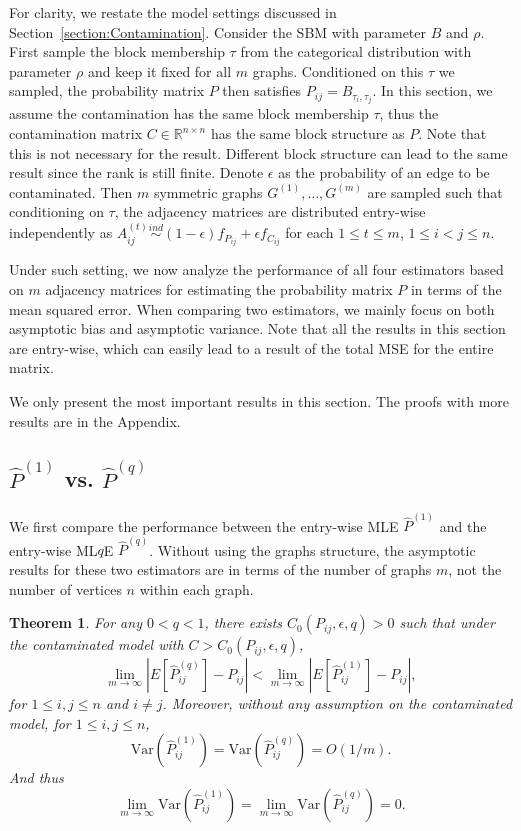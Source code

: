 \documentclass[a4paper]{article}
\newtheorem{theorem}[fact]{Theorem}
\renewcommand{\hat}{\widehat}
\begin{document}
For clarity, we restate the model settings discussed in Section~\ref{section:Contamination}. Consider the SBM with parameter $B$ and $\rho$. First sample the block membership $\tau$ from the categorical distribution with parameter $\rho$ and keep it fixed for all $m$ graphs. Conditioned on this $\tau$ we sampled, the probability matrix $P$ then satisfies $P_{ij} = B_{\tau_i, \tau_j}$. In this section, we assume the contamination has the same block membership $\tau$, thus the contamination matrix $C \in \mathbb{R}^{n \times n}$ has the same block structure as $P$. Note that this is not necessary for the result. Different block structure can lead to the same result since the rank is still finite. Denote $\epsilon$ as the probability of an edge to be contaminated. Then $m$ symmetric graphs $G^{(1)}, \dotsc, G^{(m)}$  are sampled such that conditioning on $\tau$, the adjacency matrices are distributed entry-wise independently as $A^{(t)}_{ij} \stackrel{ind}{\sim} (1-\epsilon) f_{P_{ij}} + \epsilon f_{C_{ij}}$ for each $1 \le t \le m$, $1 \le i < j \le n$. 

Under such setting, we now analyze the performance of all four estimators based on $m$ adjacency matrices for estimating the probability matrix $P$ in terms of the mean squared error. When comparing two estimators, we mainly focus on both asymptotic bias and asymptotic variance. Note that all the results in this section are entry-wise, which can easily lead to a result of the total MSE for the entire matrix.

We only present the most important results in this section. The proofs with more results are in the Appendix.

\subsection{$\hat{P}^{(1)}$ vs. $\hat{P}^{(q)}$}
\label{section:MLEvsMLqE}
We first compare the performance between the entry-wise MLE $\hat{P}^{(1)}$ and the entry-wise ML$q$E $\hat{P}^{(q)}$. Without using the graphs structure, the asymptotic results for these two estimators are in terms of the number of graphs $m$, not the number of vertices $n$ within each graph.



\begin{theorem}
\label{thm:MLEvsMLqE}
For any $0 < q < 1$, there exists $C_0(P_{ij}, \epsilon, q) > 0$ such that under the contaminated model with $C > C_0(P_{ij}, \epsilon, q)$,
\[
	\lim_{m \to \infty} \left| E[\hat{P}^{(q)}_{ij}] - P_{ij} \right| < 
    \lim_{m \to \infty} \left| E[\hat{P}^{(1)}_{ij}] - P_{ij} \right|,
\]
for $1 \le i, j \le n$ and $i \ne j$.
Moreover, without any assumption on the contaminated model, for $1 \le i, j \le n$, 
\[
	\mathrm{Var}(\hat{P}^{(1)}_{ij})
    = \mathrm{Var}(\hat{P}^{(q)}_{ij}) = O(1/m).
\]
And thus
\[
	\lim_{m \to \infty} \mathrm{Var}(\hat{P}^{(1)}_{ij})
    = \lim_{m \to \infty} \mathrm{Var}(\hat{P}^{(q)}_{ij}) = 0.
\]
\end{theorem}
\end{document}
